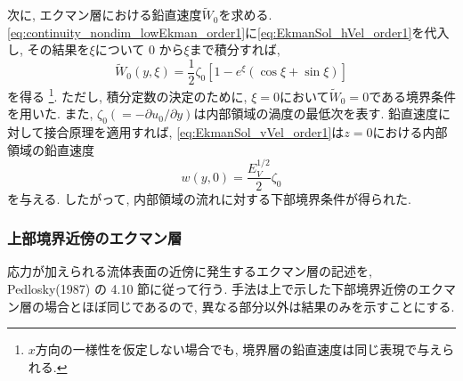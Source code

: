 次に, エクマン層における鉛直速度$\tilde{W}_0$を求める. 
\eqref{eq:continuity_nondim_lowEkman_order1}に\eqref{eq:EkmanSol_hVel_order1}を代入し, 
その結果を$\xi$について 0 から$\xi$まで積分すれば, 
\begin{equation}
\boxed{
 \tilde{W}_0(y,\xi) = \dfrac{1}{2} \zeta_0 
    \left[ 1 - e^{\xi}(\cos{\xi} + \sin{\xi} ) \right]
}
\label{eq:EkmanSol_vVel_order1}
\end{equation}
を得る%
\footnote{
$x$方向の一様性を仮定しない場合でも, 境界層の鉛直速度は同じ表現で与えられる. 
}. 
ただし, 積分定数の決定のために, $\xi=0$において$\tilde{W}_0=0$である境界条件を用いた. 
また, $\zeta_0(=-\partial u_0/\partial y)$は内部領域の渦度の最低次を表す. 
鉛直速度に対して接合原理を適用すれば, \eqref{eq:EkmanSol_vVel_order1}は$z=0$における内部領域の鉛直速度
\begin{equation}
\boxed{
 w(y,0) = \dfrac{E_V^{1/2}}{2} \zeta_0 
}
\label{eq:BC_interior_btm_nodim}
\end{equation}
を与える. 
したがって, 内部領域の流れに対する下部境界条件が得られた. 

\subsubsection*{上部境界近傍のエクマン層}
応力が加えられる流体表面の近傍に発生するエクマン層の記述を, Pedlosky(1987) の 4.10 節に従って行う. 
手法は上で示した下部境界近傍のエクマン層の場合とほぼ同じであるので, 
異なる部分以外は結果のみを示すことにする. 

